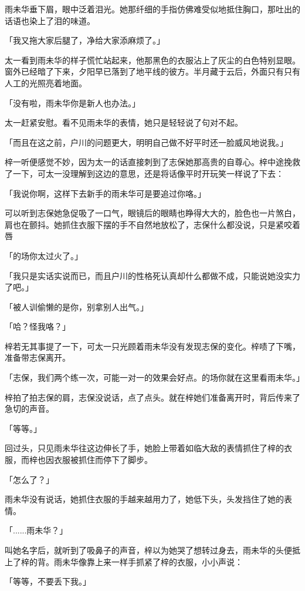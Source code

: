 \documentclass[UTF8]{ctexart}
\begin{document}
    雨未华垂下眉，眼中泛着泪光。她那纤细的手指仿佛难受似地抵住胸口，那吐出的话语也染上了泪的味道。

    「我又拖大家后腿了，净给大家添麻烦了。」

    太一看到雨未华的样子慌忙站起来，他那黑色的衣服沾上了灰尘的白色特别显眼。窗外已经暗了下来，夕阳早已落到了地平线的彼方。半月藏于云后，外面只有只有人工的光照亮着地面。

    「没有啦，雨未华你是新人也办法。」

    太一赶紧安慰。看不见雨未华的表情，她只是轻轻说了句对不起。

    「而且在这之前，户川的问题更大，明明自己做不好平时还一脸威风地说我。」

    梓一听便感觉不妙，因为太一的话直接刺到了志保她那高贵的自尊心。梓中途挽救了一下，可太一没理解到这边的意思，还是将话像平时开玩笑一样说了下去：

    「我说你啊，这样下去新手的雨未华可是要追过你咯。」

    可以听到志保她急促吸了一口气，眼镜后的眼睛也睁得大大的，脸色也一片煞白，肩也在颤抖。她抓住衣服下摆的手不自然地放松了，志保什么都没说，只是紧咬着唇

    「的场你太过火了。」

    「我只是实话实说而已，而且户川的性格死认真却什么都做不成，只能说她没实力了吧。」

    「被人训偷懒的是你，别拿别人出气。」

    「哈？怪我咯？」

    梓若无其事提了一下，可太一只光顾着雨未华没有发现志保的变化。梓啧了下嘴，准备带志保离开。

    「志保，我们两个练一次，可能一对一的效果会好点。的场你就在这里看雨未华。」

    梓拍了拍志保的肩，志保没说话，点了点头。就在梓她们准备离开时，背后传来了急切的声音。

    「等等。」

    回过头，只见雨未华往这边伸长了手，她脸上带着如临大敌的表情抓住了梓的衣服，而梓也因衣服被抓住而停下了脚步。

    「怎么了？」

    雨未华没有说话，她抓住衣服的手越来越用力了，她低下头，头发挡住了她的表情。

    「......雨未华？」

    叫她名字后，就听到了吸鼻子的声音，梓以为她哭了想转过身去，雨未华的头便抵上了梓的背。雨未华像靠上来一样手抓紧了梓的衣服，小小声说：

    「等等，不要丢下我。」
\end{document}
